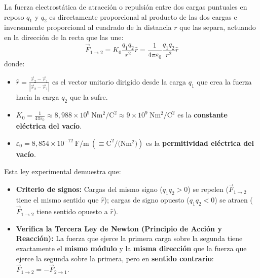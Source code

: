 \begin{ley}
La fuerza electrostática de atracción o repulsión entre dos cargas puntuales en reposo $q_1$ y $q_2$ es directamente proporcional al producto de las dos cargas e inversamente proporcional al cuadrado de la distancia $r$ que las separa, actuando en la dirección de la recta que las une:
\begin{equation}
    \vec{F}_{1 \to 2} = K_0 \frac{q_1 q_2}{r^2} \hat{r} = \frac{1}{4\pi\varepsilon_0} \frac{q_1 q_2}{r^2} \hat{r}
\end{equation}
donde:
\begin{itemize}[leftmargin=*]
    \item $\hat{r} = \frac{\vec{r}_2 - \vec{r}_1}{|\vec{r}_2 - \vec{r}_1|}$ es el vector unitario dirigido desde la carga $q_1$ que crea la fuerza hacia la carga $q_2$ que la sufre.
    \item $K_0 = \frac{1}{4\pi\varepsilon_0} \approx 8{,}988 \times 10^9\ \si{\newton\meter\squared\per\coulomb\squared} \approx 9 \times 10^9\ \si{\newton\meter\squared\per\coulomb\squared}$ es la \textbf{constante eléctrica del vacío}.
    \item $\varepsilon_0 = 8{,}854 \times 10^{-12}\ \si{\farad\per\meter}\ (\equiv \si{\coulomb\squared\per(\newton\meter\squared)})$ es la \textbf{permitividad eléctrica del vacío}.
\end{itemize}
\end{ley}

\begin{aviso}
Esta ley experimental demuestra que:
\begin{itemize}[leftmargin=*]
    \item \textbf{Criterio de signos:} Cargas del mismo signo ($q_1 q_2 > 0$) se repelen ($\vec{F}_{1\to 2}$ tiene el mismo sentido que $\hat{r}$); cargas de signo opuesto ($q_1 q_2 < 0$) se atraen ($\vec{F}_{1\to 2}$ tiene sentido opuesto a $\hat{r}$).
    \item \textbf{Verifica la Tercera Ley de Newton (Principio de Acción y Reacción):} La fuerza que ejerce la primera carga sobre la segunda tiene exactamente el \textbf{mismo módulo} y la \textbf{misma dirección} que la fuerza que ejerce la segunda sobre la primera, pero en \textbf{sentido contrario}: $\vec{F}_{1\to 2} = -\vec{F}_{2\to 1}$.
\end{itemize}
\end{aviso}

